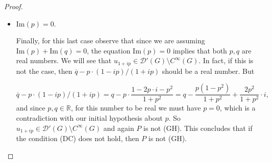 \documentclass[10pt,a4paper]{amsart}
\renewcommand{\Im}{\textrm{Im}}
\begin{document}
\begin{proof}
\begin{itemize}
\item[2.2)] $\Im(p) =0$.

Finally, for this last case observe that since we are assuming $\Im(p)+\Im(q)=0$, the equation $\Im(p)=0$ implies that both $p,q$ are real numbers. We will see that $u_{1+ip} \in \mathcal{D}'(G)\setminus C^\infty(G)$. In fact, if this is not the case, then $\overline{q}-p \cdot (1-ip)/(1+ip)$ should be a real number. But

$$\overline{q}-p \cdot (1-ip)/(1+ip) = q-p \cdot \frac{1-2 p \cdot i -p^2}{1+p^2} =q-\frac{p(1-p^2)}{1+p^2}+\frac{2p^2}{1+p^2} \cdot i,$$
and since $p,q \in \mathbb{R}$, for this number to be real we must have $p=0$, which is a contradiction with our initial hypothesis about $p$. So $u_{1+ip} \in \mathcal{D}'(G)\setminus C^\infty(G)$ and again $P$ is not (GH). This concludes that if the condition (DC) does not hold, then $P$ is not (GH).
\end{itemize}
\end{proof}
\end{document}
